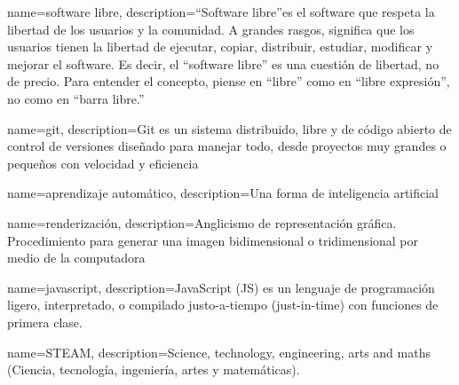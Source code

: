 
{
    name=software libre,
    description={``Software libre''es el software que respeta la libertad de los usuarios y la comunidad. A grandes rasgos, significa que los usuarios tienen la libertad de ejecutar, copiar, distribuir, estudiar, modificar y mejorar el software. Es decir, el ``software libre'' es una cuestión de libertad, no de precio. Para entender el concepto, piense en ``libre'' como en ``libre expresión'', no como en ``barra libre.''}}

                 {
                   name=git,
    description={Git es un sistema distribuido, libre y de código abierto de control de versiones diseñado para manejar todo, desde proyectos muy grandes o pequeños con velocidad y eficiencia}}

                 {
                   name=aprendizaje automático,
    description={Una forma de inteligencia artificial}}

                 {
                   name=renderización,
    description={Anglicismo de representación gráfica. Procedimiento para generar una imagen bidimensional o tridimensional por medio de la computadora}}


                 {
                   name=javascript,
    description={JavaScript (JS) es un lenguaje de programación ligero, interpretado, o compilado justo-a-tiempo (just-in-time) con funciones de primera clase.}}


                 {
                   name=STEAM,
    description={Science, technology, engineering, arts and maths (Ciencia, tecnología, ingeniería, artes y matemáticas). }}



